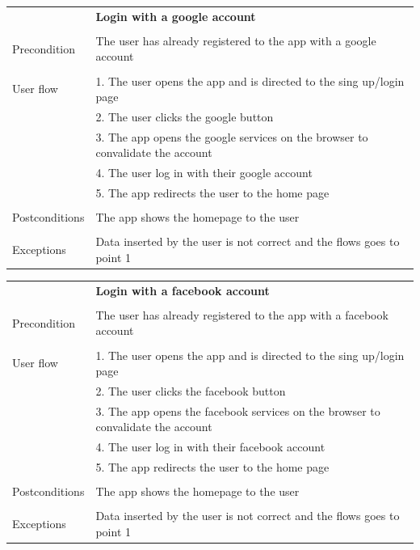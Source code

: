 \documentclass[10pt]{article}
\begin{document}
    \newline
    \newline
    \newline
    \begin{tabular}{ p{3cm}|p{8cm} }
     & \textbf{Login with a google account} \\
     \\
     Precondition & The user has already registered to the app with a google account \\ 
     \\
     User flow  
     & 1. The user opens the app and is directed to the sing up/login page \\
     & 2. The user clicks the google button\\ 
     & 3. The app opens the google services on the browser to convalidate the account  \\
     & 4. The user log in with their google account\\
     & 5. The app redirects the user to the home page\\
     \\
     Postconditions & The app shows the homepage to the user \\ 
     \\
     Exceptions & Data inserted by the user is not correct and the flows goes to point 1\\
    \end{tabular}
    \newline
    \newline
    \newline
    \begin{tabular}{ p{3cm}|p{8cm} }
     & \textbf{Login with a facebook account} \\
     \\
     Precondition & The user has already registered to the app with a facebook account \\ 
     \\
     User flow 
     & 1. The user opens the app and is directed to the sing up/login page \\
     & 2. The user clicks the facebook button\\ 
     & 3. The app opens the facebook services on the browser to convalidate the account  \\
     & 4. The user log in with their facebook account\\
     & 5. The app redirects the user to the home page\\
     \\
     Postconditions & The app shows the homepage to the user \\
     \\
     Exceptions & Data inserted by the user is not correct and the flows goes to point 1\\
    \end{tabular}
\end{document}
